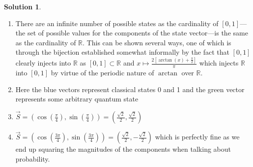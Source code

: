 \documentclass[10pt]{article}
\theoremstyle{definition}
\newtheorem{soln}{Solution}
\begin{document}
\begin{soln}~
  \begin{enumerate}[label=(\alph*)]
    \item There are an infinite number of possible states as the cardinality of $[0,1]$---the set of possible values for the components of the state vector---is the same as the cardinality of $\mathbb{R}$. This can be shown several ways,
          one of which is through the bijection established somewhat informally by the fact that $[0,1]$ clearly injects into $\mathbb{R}$ as $[0,1]\subset\mathbb{R}$
          and $x\mapsto \frac{2\left[\arctan(x)+\frac{\pi}{2}\right]}{\pi}$ which injects $\mathbb{R}$ into $[0,1]$ by virtue of the periodic nature of $\arctan$ over $\mathbb{R}$.
    \item Here the blue vectors represent classical states 0 and 1 and the green vector represents some arbitrary quantum state
          \begin{center}
          \end{center}
    \item $\displaystyle\vec{S}=\left(\cos\left(\frac{\pi}{4}\right),\sin\left(\frac{\pi}{4}\right)\right)=\left(\frac{\sqrt{2}}{2},\frac{\sqrt{2}}{2}\right)$
    \item $\displaystyle\vec{S}=\left(\cos\left(\frac{3\pi}{4}\right),\sin\left(\frac{3\pi}{4}\right)\right)=\left(\frac{\sqrt{2}}{2},-\frac{\sqrt{2}}{2}\right)$ 
    which is perfectly fine as we end up squaring the magnitudes of the components when talking about probability.
  \end{enumerate}
\end{soln}
\end{document}
